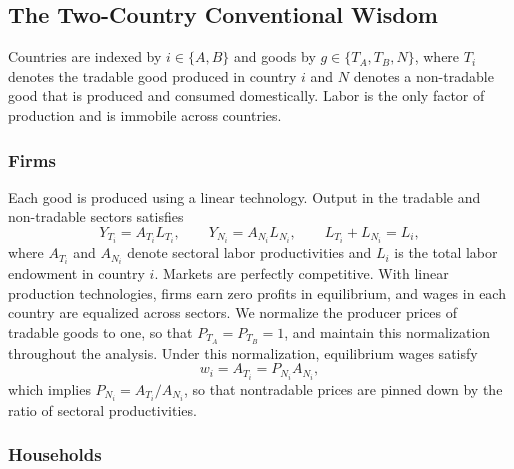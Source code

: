 \documentclass[11pt]{article}
\theoremstyle{plain}
\theoremstyle{remark}
\numberwithin{lemma}{section}
\numberwithin{proposition}{section}
\numberwithin{corollary}{section}
\begin{document}
\subsection{The Two-Country Conventional Wisdom}
\label{sec:twocountry_cw}

Countries are indexed by $i \in \{A,B\}$ and goods by $g \in \{T_A, T_B, N\}$, where $T_i$ denotes the tradable good produced in country $i$ and $N$ denotes a non-tradable good that is produced and consumed domestically. Labor is the only factor of production and is immobile across countries.

\subsubsection{Firms}

Each good is produced using a linear technology. Output in the tradable and non-tradable sectors satisfies
\begin{equation}
Y_{T_i} = A_{T_i} L_{T_i}, \qquad Y_{N_i} = A_{N_i} L_{N_i}, \qquad L_{T_i} + L_{N_i} = L_i,
\end{equation}
where $A_{T_i}$ and $A_{N_i}$ denote sectoral labor productivities and $L_i$ is the total labor endowment in country $i$. Markets are perfectly competitive. With linear production technologies, firms earn zero profits in equilibrium, and wages in each country are equalized across sectors. We normalize the producer prices of tradable goods to one, so that $P_{T_A}=P_{T_B}=1$, and maintain this normalization throughout the analysis. Under this normalization, equilibrium wages satisfy
\begin{equation}
w_i = A_{T_i} = P_{N_i} A_{N_i},
\label{eq:wage}
\end{equation}
which implies $P_{N_i} = A_{T_i}/A_{N_i}$, so that nontradable prices are pinned down by the ratio of sectoral productivities.

\subsubsection{Households}
\end{document}
